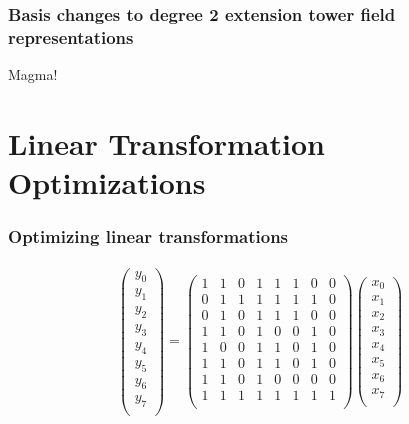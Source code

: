 \documentclass[handout]{beamer}
\begin{document}
\begin{frame}
	\frametitle{Basis changes to degree 2 extension tower field representations}
	\begin{center}
	Magma!
	\end{center}
\end{frame}


\section{Linear Transformation Optimizations}
\begin{frame}
	\frametitle{Optimizing linear transformations}
\begin{align*}
\begin{pmatrix}
y_0 \\
y_1 \\
y_2 \\
y_3 \\
y_4 \\
y_5 \\
y_6 \\
y_7 \\
\end{pmatrix} = 
\begin{pmatrix}
1 & 1 & 0 & 1 & 1 & 1 & 0 & 0 \\
0 & 1 & 1 & 1 & 1 & 1 & 1 & 0 \\
0 & 1 & 0 & 1 & 1 & 1 & 0 & 0 \\
1 & 1 & 0 & 1 & 0 & 0 & 1 & 0 \\
1 & 0 & 0 & 1 & 1 & 0 & 1 & 0 \\
1 & 1 & 0 & 1 & 1 & 0 & 1 & 0 \\
1 & 1 & 0 & 1 & 0 & 0 & 0 & 0 \\
1 & 1 & 1 & 1 & 1 & 1 & 1 & 1 \\
\end{pmatrix}
\begin{pmatrix}
x_0 \\
x_1 \\ 
x_2 \\
x_3 \\
x_4 \\
x_5 \\
x_6 \\
x_7 \\
\end{pmatrix}
\end{align*}
\end{frame}
\end{document}
